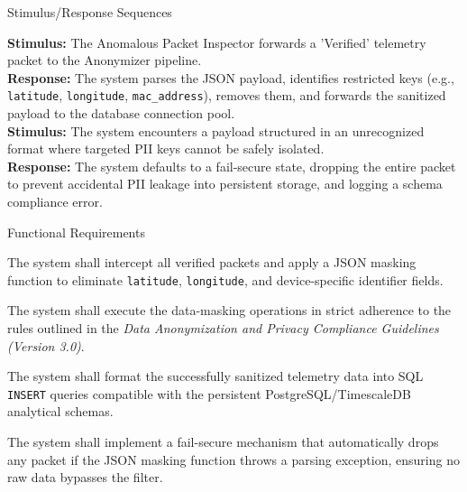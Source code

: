 \documentclass[12pt,letterpaper]{article}
\begin{document}
\par\vspace{0.083in}\noindent\hspace*{0.44in}Stimulus/Response Sequences\par\vspace{0.083in}
\begin{list}{}{\setlength{\leftmargin}{0.94in}\setlength{\rightmargin}{0pt}}\item[]
\textbf{Stimulus:} The Anomalous Packet Inspector forwards a 'Verified' telemetry packet to the Anonymizer pipeline.\\
\textbf{Response:} The system parses the JSON payload, identifies restricted keys (e.g., \texttt{latitude}, \texttt{longitude}, \texttt{mac\_address}), removes them, and forwards the sanitized payload to the database connection pool.\\
\textbf{Stimulus:} The system encounters a payload structured in an unrecognized format where targeted PII keys cannot be safely isolated.\\
\textbf{Response:} The system defaults to a fail-secure state, dropping the entire packet to prevent accidental PII leakage into persistent storage, and logging a schema compliance error.
\end{list}

\par\vspace{0.083in}\noindent\hspace*{0.44in}Functional Requirements\par\vspace{0.083in}

\vspace{0.08in}
\noindent\hspace*{0.94in} The system shall intercept all verified packets and apply a JSON masking function to eliminate \texttt{latitude}, \texttt{longitude}, and device-specific identifier fields.\par
\vspace{0.04in}
\noindent\hspace*{0.94in} The system shall execute the data-masking operations in strict adherence to the rules outlined in the \emph{Data Anonymization and Privacy Compliance Guidelines (Version 3.0)}.\par
\vspace{0.04in}
\noindent\hspace*{0.94in} The system shall format the successfully sanitized telemetry data into SQL \texttt{INSERT} queries compatible with the persistent PostgreSQL/TimescaleDB analytical schemas.\par
\vspace{0.04in}
\noindent\hspace*{0.94in} The system shall implement a fail-secure mechanism that automatically drops any packet if the JSON masking function throws a parsing exception, ensuring no raw data bypasses the filter.\par
\end{document}
